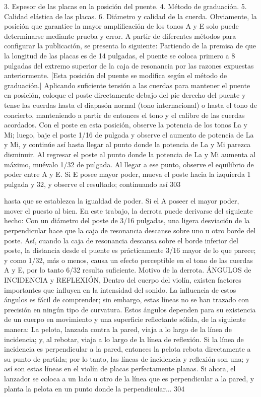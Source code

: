 3. Espesor de las placas en la posición del puente.
4. Método de graduación.
5. Calidad elástica de las placas.
6. Diámetro y calidad de la cuerda.
Obviamente, la posición que garantice la mayor amplificación de los tonos A y E solo puede determinarse mediante prueba y error.
A partir de diferentes métodos para configurar la publicación, se presenta lo siguiente:
Partiendo de la premisa de que la longitud de las placas es de 14 pulgadas, el puente se coloca primero a 8 pulgadas del extremo superior de la caja de resonancia por las razones expuestas anteriormente.
[Esta posición del puente se modifica según el método de graduación.]
Aplicando suficiente tensión a las cuerdas para mantener el puente en posición, coloque el poste directamente debajo del pie derecho del puente y tense las cuerdas hasta el diapasón normal (tono internacional) o hasta el tono de concierto, manteniendo a partir de entonces el tono y el calibre de las cuerdas acordados.
Con el poste en esta posición, observe la potencia de los tonos La y Mi; luego, baje el poste 1/16 de pulgada y observe el aumento de potencia de La y Mi, y continúe así hasta llegar al punto donde la potencia de La y Mi parezca disminuir. Al regresar el poste al punto donde la potencia de La y Mi aumenta al máximo, muévalo 1/32 de pulgada.
Al llegar a ese punto, observe el equilibrio de poder entre A y E. Si E posee mayor poder, mueva el poste hacia la izquierda 1 pulgada y 32, y observe el resultado; continuando así
303

hasta que se establezca la igualdad de poder. Si el A
poseer el mayor poder, mover el puesto al
bien.
En este trabajo, la derrota puede derivarse del siguiente hecho: Con un diámetro del poste de 3/16 pulgadas, una ligera desviación de la perpendicular hace que la caja de resonancia descanse sobre uno u otro borde del poste. Así, cuando la caja de resonancia descansa sobre el borde inferior del poste, la distancia desde el puente es prácticamente 3/16 mayor de lo que parece; y como 1/32, más o menos, causa un efecto perceptible en el tono de las cuerdas A y E, por lo tanto 6/32 resulta suficiente.
Motivo de la derrota.
ÁNGULOS de INCIDENCIA y REFLEXIÓN,
\label{angulos}
Dentro del cuerpo del violín, existen factores importantes que influyen en la intensidad del sonido. La influencia de estos ángulos es fácil de comprender; sin embargo, estas líneas no se han trazado con precisión en ningún tipo de curvatura.
Estos ángulos dependen para su existencia de un cuerpo en movimiento y una superficie reflectante sólida, de la siguiente manera: La pelota, lanzada contra la pared, viaja a lo largo de la línea de incidencia; y, al rebotar, viaja a lo largo de la línea de reflexión. Si la línea de incidencia es perpendicular a la pared, entonces la pelota rebota directamente a su punto de partida; por lo tanto, las líneas de incidencia y reflexión son una; y así son estas líneas en el violín de placas perfectamente planas. Si ahora, el lanzador se coloca a un lado u otro de la línea que es perpendicular a la pared, y planta la pelota en un punto donde la perpendicular...
304

